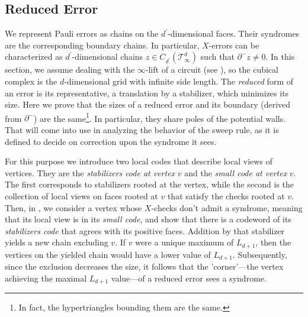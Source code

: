 
\subsection{Reduced Error}
We represent Pauli errors as chains on the $d^{\prime}$-dimensional faces. Their syndromes are the corresponding boundary chains. In particular, $X$-errors can be characterized as $d^{\prime}$-dimensional chains $z \in C_{d^{\prime}}(\mathcal T_\infty^d)$ such that $\partial^{-} z \neq 0$. In this section, we assume dealing with the $\infty$-lift of a circuit (see ), so the cubical complex is the $d$-dimensional grid with infinite side length. The \textit{reduced} form of an error is its representative, a translation by a stabilizer, which minimizes its size. Here we prove that the sizes of a reduced error and its boundary (derived from $\partial^{-}$) are the same\footnote{In fact, the hypertriangles bounding them are the same.}. In particular, they share poles of the potential walls. That will come into use in analyzing the behavior of the sweep rule, as it is defined to decide on correction upon the syndrome it sees.

For this purpose we introduce two local codes that describe local views of vertices. They are the \textit{stabilizers code at vertex} $v$ and the \textit{small code at vertex} $v$. The first corresponds to stabilizers rooted at the vertex, while the second is the collection of local views on faces rooted at $v$ that satisfy the checks rooted at $v$. Then, in , we consider a vertex whose $X$-checks don't admit a syndrome, meaning that its local view is in its \textit{small code}, and show that there is a codeword of its \textit{stabilizers code} that agrees with its positive faces. Addition by that stabilizer yields a new chain excluding $v$. If $v$ were a unique maximum of $L_{d+1}$, then the vertices on the yielded chain would have a lower value of $L_{d+1}$. Subsequently, since the exclusion decreases the size, it follows that the 'corner'—the vertex achieving the maximal $L_{d+1}$ value—of a reduced error sees a syndrome.

